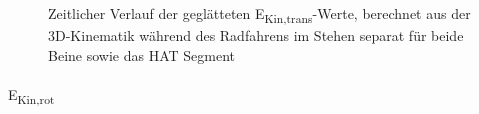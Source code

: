 \documentclass[
  letterpaper,
  DIV=11]{scrartcl}
\makeatletter
\let\oldparagraph\paragraph
\renewcommand{\paragraph}{
    \@ifstar
      \xxxParagraphStar
      \xxxParagraphNoStar
  }
\newcommand{\xxxParagraphStar}[1]{\oldparagraph*{#1}\mbox{}}
\newcommand{\xxxParagraphNoStar}[1]{\oldparagraph{#1}\mbox{}}
\makeatother
\begin{document}
\begin{figure}


\caption{\label{fig-PInt_Kinematik_HAT_Ekin_trans_stehen}Zeitlicher
Verlauf der geglätteten E\textsubscript{Kin,trans}-Werte, berechnet aus
der 3D-Kinematik während des Radfahrens im Stehen separat für beide
Beine sowie das HAT Segment}

\end{figure}%

\paragraph{\texorpdfstring{E\textsubscript{Kin,rot}}{EKin,rot}}
\end{document}

